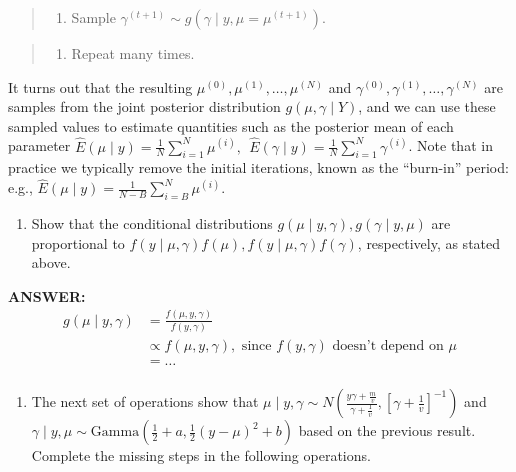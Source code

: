 \documentclass[
]{article}
\providecommand{\tightlist}{%
  \setlength{\itemsep}{0pt}\setlength{\parskip}{0pt}}
\begin{document}
\begin{quote}
\begin{enumerate}
\def\labelenumi{(\arabic{enumi})}
\setcounter{enumi}{2}
\tightlist
\item
  Sample \(\gamma^{(t+1)} \sim g(\gamma \mid y, \mu = \mu^{(t+1)})\).
\end{enumerate}
\end{quote}

\begin{quote}
\begin{enumerate}
\def\labelenumi{(\arabic{enumi})}
\setcounter{enumi}{3}
\tightlist
\item
  Repeat many times.
\end{enumerate}
\end{quote}

It turns out that the resulting
\(\mu^{(0)}, \mu^{(1)}, \dots, \mu^{(N)}\) and
\(\gamma^{(0)}, \gamma^{(1)}, \dots, \gamma^{(N)}\) are samples from the
joint posterior distribution \(g(\mu, \gamma \mid Y)\), and we can use
these sampled values to estimate quantities such as the posterior mean
of each parameter
\(\hat{E}(\mu \mid y) = \frac{1}{N}\sum_{i=1}^N \mu^{(i)}, \ \ \hat{E}(\gamma \mid y) = \frac{1}{N}\sum_{i=1}^N \gamma^{(i)}\).
Note that in practice we typically remove the initial iterations, known
as the ``burn-in'' period: e.g.,
\(\hat{E}(\mu \mid y) = \frac{1}{N-B}\sum_{i=B}^N \mu^{(i)}\).

\begin{enumerate}
\def\labelenumi{\arabic{enumi}.}
\setcounter{enumi}{1}
\tightlist
\item
  Show that the conditional distributions
  \(g(\mu \mid y, \gamma), g(\gamma \mid y, \mu)\) are proportional to
  \(f(y \mid \mu, \gamma)f(\mu), f(y \mid \mu,\gamma)f(\gamma)\),
  respectively, as stated above.
\end{enumerate}

\textbf{ANSWER:} \[
\begin{aligned}
g(\mu \mid y, \gamma) &= \frac{f(\mu, y, \gamma)}{f(y, \gamma)} \\
& \propto f(\mu, y, \gamma), \text{ since } f(y, \gamma) \text{ doesn't depend on } \mu \\
& = \dots \\
\end{aligned}
\]

\begin{enumerate}
\def\labelenumi{\arabic{enumi}.}
\setcounter{enumi}{2}
\tightlist
\item
  The next set of operations show that
  \(\mu \mid y, \gamma \sim N\left(\frac{y\gamma + \frac{m}{v}}{\gamma + \frac{1}{v}}, \left[\gamma + \frac{1}{v} \right]^{-1}\right)\)
  and
  \(\gamma \mid y, \mu \sim \text{Gamma}\left(\frac{1}{2} + a, \frac{1}{2}(y-\mu)^2 + b\right)\)
  based on the previous result. Complete the missing steps in the
  following operations.
\end{enumerate}
\end{document}
